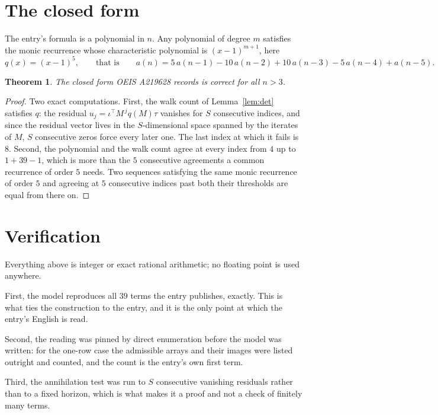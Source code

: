 \documentclass[11pt,a4paper]{article}
\theoremstyle{plain}
\newtheorem{theorem}{Theorem}
\theoremstyle{definition}
\begin{document}
\section{The closed form}

The entry's formula is a polynomial in $n$. Any polynomial of degree $m$ satisfies the monic
recurrence whose characteristic polynomial is $(x-1)^{m+1}$, here
\[
q(x)=(x-1)^{5},\qquad\text{that is}\qquad a(n)=5\,a(n-1) - 10\,a(n-2) + 10\,a(n-3) - 5\,a(n-4) + a(n-5).
\]

\begin{theorem}
The closed form OEIS A219628 records is correct for all $n>3$.
\end{theorem}

\begin{proof}
Two exact computations. First, the walk count of Lemma~\ref{lem:det} satisfies $q$: the
residual $u_j=\iota^{\!\top}M^{\,j}q(M)\tau$ vanishes for $S$ consecutive indices, and
since the residual vector lives in the $S$-dimensional space spanned by the iterates of $M$,
$S$ consecutive zeros force every later one. The last index at which it fails is $8$.
Second, the polynomial and the walk count agree at every index from $4$ up to
$1 + 39 - 1$, which is more than the $5$ consecutive agreements a
common recurrence of order $5$ needs. Two sequences satisfying the same monic recurrence
of order $5$ and agreeing at $5$ consecutive indices past both their thresholds are
equal from there on.
\end{proof}

\section{Verification}

Everything above is integer or exact rational arithmetic; no floating point is used anywhere.

First, the model reproduces all $39$ terms the entry publishes, exactly. This is what
ties the construction to the entry, and it is the only point at which the entry's English is
read.

Second, the reading was pinned by direct enumeration before the model was written: for the
one-row case the admissible arrays and their images were listed outright and counted, and the
count is the entry's own first term.

Third, the annihilation test was run to $S$ consecutive vanishing residuals rather than to a
fixed horizon, which is what makes it a proof and not a check of finitely many terms.
\end{document}

